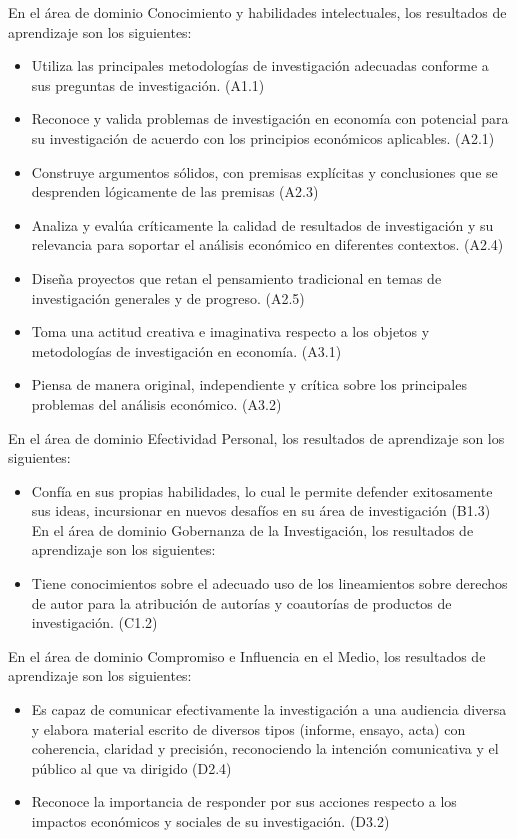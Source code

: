 En el área de dominio Conocimiento y habilidades intelectuales, los resultados de aprendizaje son los siguientes:
\begin{itemize}
\item	Utiliza las principales metodologías de investigación adecuadas conforme a sus preguntas de investigación. (A1.1)
\item	Reconoce y valida problemas de investigación en economía con potencial para su investigación de acuerdo con los principios económicos aplicables. (A2.1)
\item	Construye argumentos sólidos, con premisas explícitas y conclusiones que se desprenden lógicamente de las premisas (A2.3)
\item	Analiza y evalúa críticamente la calidad de resultados de investigación y su relevancia para soportar el análisis económico en diferentes contextos. (A2.4)
\item	Diseña proyectos que retan el pensamiento tradicional en temas de investigación generales y de progreso. (A2.5)
\item	Toma una actitud creativa e imaginativa respecto a los objetos y metodologías de investigación en economía. (A3.1)
\item	Piensa de manera original, independiente y crítica sobre los principales problemas del análisis económico. (A3.2)
\end{itemize}
En el área de dominio Efectividad Personal, los resultados de aprendizaje son los siguientes:
\begin{itemize}
\item	Confía en sus propias habilidades, lo cual le permite defender exitosamente sus ideas, incursionar en nuevos desafíos en su área de investigación (B1.3)
En el área de dominio Gobernanza de la Investigación, los resultados de aprendizaje son los siguientes:
\item	Tiene conocimientos sobre el adecuado uso de los lineamientos sobre derechos de autor para la atribución de autorías y coautorías de productos de investigación. (C1.2)
\end{itemize}
En el área de dominio Compromiso e Influencia en el Medio, los resultados de aprendizaje son los siguientes:
\begin{itemize}
\item	Es capaz de comunicar efectivamente la investigación a una audiencia diversa y elabora material escrito de diversos tipos (informe, ensayo, acta) con coherencia, claridad y precisión, reconociendo la intención comunicativa y el público al que va dirigido (D2.4)
\item	Reconoce la importancia de responder por sus acciones respecto a los impactos económicos y sociales de su investigación. (D3.2)
\end{itemize}


